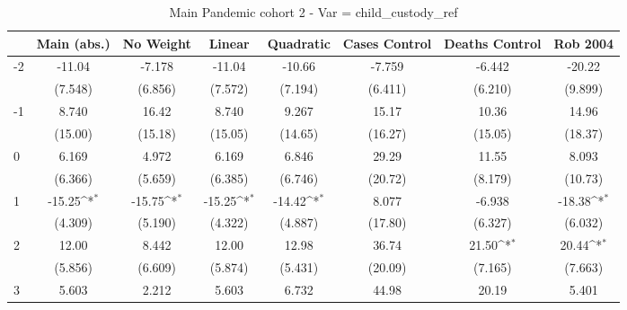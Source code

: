 \documentclass{article}
\begin{document}
{
\def\sym#1{\ifmmode^{#1}\else\(^{#1}\)\fi}
\begin{longtable}{l*{7}{c}}
\caption{Main Pandemic cohort 2 - Var = child\_custody\_ref}\\
\hline\hline\endfirsthead\hline\endhead\hline\endfoot\endlastfoot
                &\multicolumn{1}{c}{Main (abs.)}&\multicolumn{1}{c}{No Weight}&\multicolumn{1}{c}{Linear}&\multicolumn{1}{c}{Quadratic}&\multicolumn{1}{c}{Cases Control}&\multicolumn{1}{c}{Deaths Control}&\multicolumn{1}{c}{Rob 2004}\\
\hline
-2              &   -11.04         &   -7.178         &   -11.04         &   -10.66         &   -7.759         &   -6.442         &   -20.22         \\
                &  (7.548)         &  (6.856)         &  (7.572)         &  (7.194)         &  (6.411)         &  (6.210)         &  (9.899)         \\
-1              &    8.740         &    16.42         &    8.740         &    9.267         &    15.17         &    10.36         &    14.96         \\
                &  (15.00)         &  (15.18)         &  (15.05)         &  (14.65)         &  (16.27)         &  (15.05)         &  (18.37)         \\
0               &    6.169         &    4.972         &    6.169         &    6.846         &    29.29         &    11.55         &    8.093         \\
                &  (6.366)         &  (5.659)         &  (6.385)         &  (6.746)         &  (20.72)         &  (8.179)         &  (10.73)         \\
1               &   -15.25\sym{*}  &   -15.75\sym{*}  &   -15.25\sym{*}  &   -14.42\sym{*}  &    8.077         &   -6.938         &   -18.38\sym{*}  \\
                &  (4.309)         &  (5.190)         &  (4.322)         &  (4.887)         &  (17.80)         &  (6.327)         &  (6.032)         \\
2               &    12.00         &    8.442         &    12.00         &    12.98         &    36.74         &    21.50\sym{*}  &    20.44\sym{*}  \\
                &  (5.856)         &  (6.609)         &  (5.874)         &  (5.431)         &  (20.09)         &  (7.165)         &  (7.663)         \\
3               &    5.603         &    2.212         &    5.603         &    6.732         &    44.98         &    20.19         &    5.401         \\

\end{longtable}}
\end{document}
